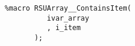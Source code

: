 ﻿\begin{verbatim}
%macro RSUArray__ContainsItem(
          ivar_array
          , i_item
       );
\end{verbatim}